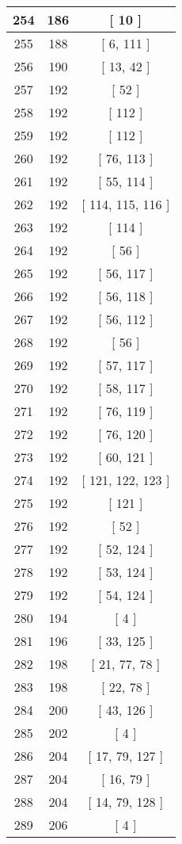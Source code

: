 \begin{center}
\begin{longtable}[H]{|| c c c ||}
\hline
254 & 186 & [ 10 ] \\ 
\hline
255 & 188 & [ 6, 111 ] \\ 
\hline
256 & 190 & [ 13, 42 ] \\ 
\hline
257 & 192 & [ 52 ] \\ 
\hline
258 & 192 & [ 112 ] \\ 
\hline
259 & 192 & [ 112 ] \\ 
\hline
260 & 192 & [ 76, 113 ] \\ 
\hline
261 & 192 & [ 55, 114 ] \\ 
\hline
262 & 192 & [ 114, 115, 116 ] \\ 
\hline
263 & 192 & [ 114 ] \\ 
\hline
264 & 192 & [ 56 ] \\ 
\hline
265 & 192 & [ 56, 117 ] \\ 
\hline
266 & 192 & [ 56, 118 ] \\ 
\hline
267 & 192 & [ 56, 112 ] \\ 
\hline
268 & 192 & [ 56 ] \\ 
\hline
269 & 192 & [ 57, 117 ] \\ 
\hline
270 & 192 & [ 58, 117 ] \\ 
\hline
271 & 192 & [ 76, 119 ] \\ 
\hline
272 & 192 & [ 76, 120 ] \\ 
\hline
273 & 192 & [ 60, 121 ] \\ 
\hline
274 & 192 & [ 121, 122, 123 ] \\ 
\hline
275 & 192 & [ 121 ] \\ 
\hline
276 & 192 & [ 52 ] \\ 
\hline
277 & 192 & [ 52, 124 ] \\ 
\hline
278 & 192 & [ 53, 124 ] \\ 
\hline
279 & 192 & [ 54, 124 ] \\ 
\hline
280 & 194 & [ 4 ] \\ 
\hline
281 & 196 & [ 33, 125 ] \\ 
\hline
282 & 198 & [ 21, 77, 78 ] \\ 
\hline
283 & 198 & [ 22, 78 ] \\ 
\hline
284 & 200 & [ 43, 126 ] \\ 
\hline
285 & 202 & [ 4 ] \\ 
\hline
286 & 204 & [ 17, 79, 127 ] \\ 
\hline
287 & 204 & [ 16, 79 ] \\ 
\hline
288 & 204 & [ 14, 79, 128 ] \\ 
\hline
289 & 206 & [ 4 ] \\ 

\end{longtable}
\end{center}
